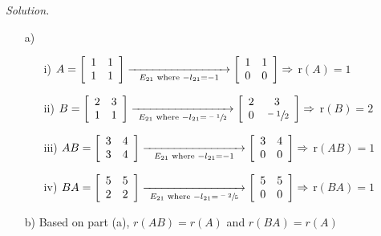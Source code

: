 \documentclass[12pt]{article}
\begin{document}
\begin{itemize}
\textit{Solution.}
\begin{itemize}
\item[a)] 
	\begin{itemize}
	\item[i)] $A = \left[\begin{array}{ccc} 1 & 1\\ 1 & 1\end{array}\right]
    		  \underset{E_{21} \text{ where } -l_{21}=-1}{\xrightarrow{\hspace{30mm}}}
              \left[\begin{array}{ccc} 1 & 1\\ 0  & 0\end{array}\right] \Rightarrow$ r$(A)=1$
    \item[ii)] $B = \left[\begin{array}{ccc} 2 & 3\\ 1  & 1\end{array}\right]
    		  \underset{E_{21} \text{ where } -l_{21}=\sfrac{-1}{2}}{\xrightarrow{\hspace{30mm}}}
              \left[\begin{array}{ccc} 2 & 3\\ 0 & \sfrac{-1}{2}\end{array}\right] \Rightarrow$ r$(B)=2$
    \item[iii)] $AB = \left[\begin{array}{ccc} 3 & 4\\ 3  & 4\end{array}\right]
    		  \underset{E_{21} \text{ where } -l_{21}=-1}{\xrightarrow{\hspace{30mm}}}
              \left[\begin{array}{ccc} 3 & 4\\ 0 & 0\end{array}\right] \Rightarrow$ r$(AB)=1$
    \item[iv)] $BA = \left[\begin{array}{ccc} 5 & 5\\ 2  & 2\end{array}\right]
    		  \underset{E_{21} \text{ where } -l_{21}=\sfrac{-2}{5}}{\xrightarrow{\hspace{30mm}}}
              \left[\begin{array}{ccc} 5 & 5\\ 0 & 0\end{array}\right] \Rightarrow$ r$(BA)=1$
	\end{itemize}
\item[b)] Based on part (a), $r(AB)=r(A)$ and $r(BA)=r(A)$

\end{itemize}
\end{itemize}
\end{document}
